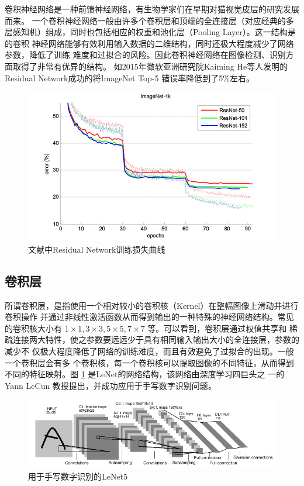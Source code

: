 卷积神经网络是一种前馈神经网络，有生物学家们在早期对猫视觉皮层的研究发展而来。
一个卷积神经网络一般由许多个卷积层和顶端的全连接层（对应经典的多
层感知机）组成，同时也包括相应的权重和池化层（Pooling Layer）。这一结构是的卷积
神经网络能够有效利用输入数据的二维结构，同时还极大程度减少了网络参数，降低了训练
难度和过拟合的风险。因此卷积神经网络在图像检测、识别方面取得了非常有优异的结构。
如2015年微软亚洲研究院Kaiming He等人发明的Residual Network成功的将ImageNet Top-5
错误率降低到了5\%左右\cite{He:2015tt}\cite{He:2016tq}。

\begin{figure}[ht]
  \centering
  \includegraphics[width=1.0\linewidth]{./Figure/ResNetTrainError.jpg}
  \caption{文献\cite{He:2015tt}中Residual Network训练损失曲线}
\end{figure}

\subsection{卷积层}

所谓卷积层，是指使用一个相对较小的卷积核（Kernel）在整幅图像上滑动并进行卷积操作
并通过非线性激活函数从而得到输出的一种特殊的神经网络结构。常见的卷积核大小有 $1
\times 1, 3 \times 3, 5 \times 5, 7 \times 7$ 等。可以看到，卷积层通过权值共享和
稀疏连接两大特性，使之参数要远远少于具有相同输入输出大小的全连接层，参数的减少不
仅极大程度降低了网络的训练难度，而且有效避免了过拟合的出现。一般一个卷积层会有多
个卷积核，每一个卷积核可以提取图像的不同特征，从而得到不同的特征映射。图
\ref{Fig:LeNet} 是LeNet\cite{LeCun:1990vp}的网络结构，该网络由深度学习四巨头之
一的Yann LeCun 教授提出，并成功应用于手写数字识别问题\cite{LeCun:1990vp}。

\begin{figure}[ht]
  \centering
  \includegraphics[width=1.0\linewidth]{./Figure/LeNet.png}
  \caption{用于手写数字识别的LeNet5\cite{LeCun:1990vp}} \label{Fig:LeNet}
\end{figure}

